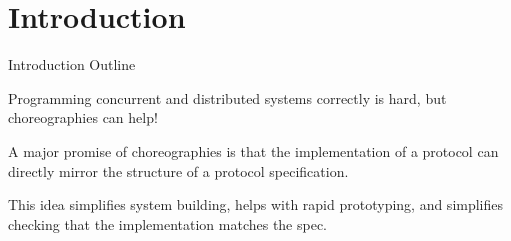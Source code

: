 \maketitle

\section{Introduction}
\label{sec:intro}

\begin{outline}{Introduction Outline}
  \item Programming concurrent and distributed systems correctly is hard, but choreographies can help!
    \begin{lvl}
      \item A major promise of choreographies is that the implementation of a protocol
        can directly mirror the structure of a protocol specification.
      \item This idea simplifies system building, helps with rapid prototyping, and simplifies checking that the implementation matches the spec.
    \end{lvl}


\end{outline}
